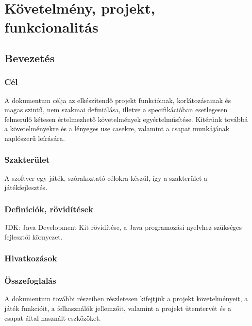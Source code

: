 \chapter{Követelmény, projekt, funkcionalitás}

\section{Bevezetés}

\subsection{Cél}
\par{A dokumentum célja az elkészítendő projekt funkcióinak, korlátozásainak és magas szintű, nem szakmai definiálása, illetve a specifikációban esetlegesen felmerülő kétesen értelmezhető követelmények egyértelműsítése. Kitérünk továbbá a követelményekre és a lényeges use casekre, valamint a csapat munkájának naplószerű leírására. }

\subsection{Szakterület}
\par{A szoftver egy játék, szórakoztató célokra készül, így a szakterület a játékfejlesztés.}

\subsection{Definíciók, rövidítések}
\begin{rov}
    JDK: Java Development Kit rövidítése, a Java programozási nyelvhez szükséges fejlesztői környezet.
\end{rov}

\subsection{Hivatkozások}

\subsection{Összefoglalás}
\par{A dokumentum további részeiben részletesen kifejtjük a projekt követelményeit, a játék funkcióit, a felhasználók jellemzőit, valamint a projekt ütemtervét és a csapat által használt eszközöket.}

